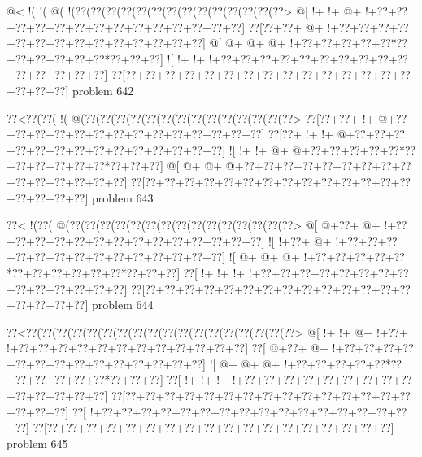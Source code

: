 \vbox{\vbox{\goo
\- @<\- !(\- !(\- @(\- !(\0??(\0??(\0??(\0??(\0??(\0??(\0??(\0??(\0??(\0??(\0??(\0??(\0??(\0??>
\- @[\- !+\- !+\- @+\- !+\0??+\0??+\0??+\0??+\0??+\0??+\0??+\0??+\0??+\0??+\0??+\0??+\0??+\0??]
\0??[\0??+\0??+\- @+\- !+\0??+\0??+\0??+\0??+\0??+\0??+\0??+\0??+\0??+\0??+\0??+\0??+\0??+\0??]
\- @[\- @+\- @+\- @+\- !+\0??+\0??+\0??+\0??+\0??*\0??+\0??+\0??+\0??+\0??+\0??*\0??+\0??+\0??]
\- ![\- !+\- !+\- !+\0??+\0??+\0??+\0??+\0??+\0??+\0??+\0??+\0??+\0??+\0??+\0??+\0??+\0??+\0??]
\0??[\0??+\0??+\0??+\0??+\0??+\0??+\0??+\0??+\0??+\0??+\0??+\0??+\0??+\0??+\0??+\0??+\0??+\0??]
}
\hfil problem 642\hfil\break
}



\vbox{\vbox{\goo
\0??<\0??(\0??(\- !(\- @(\0??(\0??(\0??(\0??(\0??(\0??(\0??(\0??(\0??(\0??(\0??(\0??(\0??(\0??>
\0??[\0??+\0??+\- !+\- @+\0??+\0??+\0??+\0??+\0??+\0??+\0??+\0??+\0??+\0??+\0??+\0??+\0??+\0??]
\0??[\0??+\- !+\- !+\- @+\0??+\0??+\0??+\0??+\0??+\0??+\0??+\0??+\0??+\0??+\0??+\0??+\0??+\0??]
\- ![\- !+\- !+\- @+\- @+\0??+\0??+\0??+\0??+\0??*\0??+\0??+\0??+\0??+\0??+\0??*\0??+\0??+\0??]
\- @[\- @+\- @+\- @+\0??+\0??+\0??+\0??+\0??+\0??+\0??+\0??+\0??+\0??+\0??+\0??+\0??+\0??+\0??]
\0??[\0??+\0??+\0??+\0??+\0??+\0??+\0??+\0??+\0??+\0??+\0??+\0??+\0??+\0??+\0??+\0??+\0??+\0??]
}
\hfil problem 643\hfil\break
}



\vbox{\vbox{\goo
\0??<\- !(\0??(\- @(\0??(\0??(\0??(\0??(\0??(\0??(\0??(\0??(\0??(\0??(\0??(\0??(\0??(\0??(\0??>
\- @[\- @+\0??+\- @+\- !+\0??+\0??+\0??+\0??+\0??+\0??+\0??+\0??+\0??+\0??+\0??+\0??+\0??+\0??]
\- ![\- !+\0??+\- @+\- !+\0??+\0??+\0??+\0??+\0??+\0??+\0??+\0??+\0??+\0??+\0??+\0??+\0??+\0??]
\- ![\- @+\- @+\- @+\- !+\0??+\0??+\0??+\0??+\0??*\0??+\0??+\0??+\0??+\0??+\0??*\0??+\0??+\0??]
\0??[\- !+\- !+\- !+\- !+\0??+\0??+\0??+\0??+\0??+\0??+\0??+\0??+\0??+\0??+\0??+\0??+\0??+\0??]
\0??[\0??+\0??+\0??+\0??+\0??+\0??+\0??+\0??+\0??+\0??+\0??+\0??+\0??+\0??+\0??+\0??+\0??+\0??]
}
\hfil problem 644\hfil\break
}



\vbox{\vbox{\goo
\0??<\0??(\0??(\0??(\0??(\0??(\0??(\0??(\0??(\0??(\0??(\0??(\0??(\0??(\0??(\0??(\0??(\0??(\0??>
\- @[\- !+\- !+\- @+\- !+\0??+\- !+\0??+\0??+\0??+\0??+\0??+\0??+\0??+\0??+\0??+\0??+\0??+\0??]
\0??[\- @+\0??+\- @+\- !+\0??+\0??+\0??+\0??+\0??+\0??+\0??+\0??+\0??+\0??+\0??+\0??+\0??+\0??]
\- ![\- @+\- @+\- @+\- !+\0??+\0??+\0??+\0??+\0??*\0??+\0??+\0??+\0??+\0??+\0??*\0??+\0??+\0??]
\0??[\- !+\- !+\- !+\- !+\0??+\0??+\0??+\0??+\0??+\0??+\0??+\0??+\0??+\0??+\0??+\0??+\0??+\0??]
\0??[\0??+\0??+\0??+\0??+\0??+\0??+\0??+\0??+\0??+\0??+\0??+\0??+\0??+\0??+\0??+\0??+\0??+\0??]
\0??[\- !+\0??+\0??+\0??+\0??+\0??+\0??+\0??+\0??+\0??+\0??+\0??+\0??+\0??+\0??+\0??+\0??+\0??]
\0??[\0??+\0??+\0??+\0??+\0??+\0??+\0??+\0??+\0??+\0??+\0??+\0??+\0??+\0??+\0??+\0??+\0??+\0??]
}
\hfil problem 645\hfil\break
}



